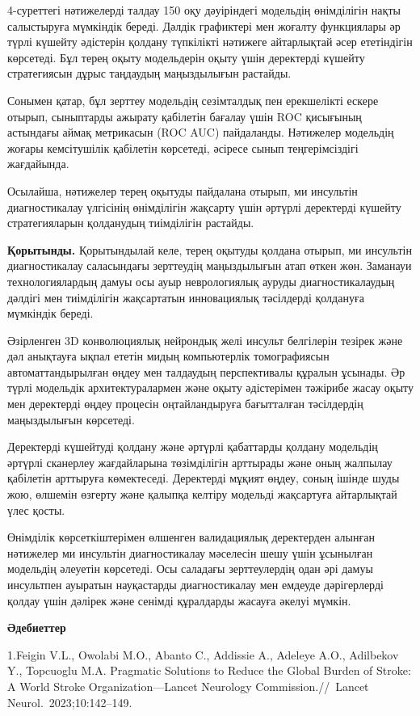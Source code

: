 4-суреттегі нәтижелерді талдау 150 оқу дәуіріндегі модельдің өнімділігін
нақты салыстыруға мүмкіндік береді. Дәлдік графиктері мен жоғалту
функциялары әр түрлі күшейту әдістерін қолдану түпкілікті нәтижеге
айтарлықтай әсер ететіндігін көрсетеді. Бұл терең оқыту модельдерін
оқыту үшін деректерді күшейту стратегиясын дұрыс таңдаудың маңыздылығын
растайды.

Сонымен қатар, бұл зерттеу модельдің сезімталдық пен ерекшелікті ескере
отырып, сыныптарды ажырату қабілетін бағалау үшін ROC қисығының
астындағы аймақ метрикасын (ROC AUC) пайдаланды. Нәтижелер модельдің
жоғары кемсітушілік қабілетін көрсетеді, әсіресе сынып теңгерімсіздігі
жағдайында.

Осылайша, нәтижелер терең оқытуды пайдалана отырып, ми инсультін
диагностикалау үлгісінің өнімділігін жақсарту үшін әртүрлі деректерді
күшейту стратегияларын қолданудың тиімділігін растайды.

\textbf{Қорытынды.} Қорытындылай келе, терең оқытуды қолдана отырып, ми
инсультін диагностикалау саласындағы зерттеудің маңыздылығын атап өткен
жөн. Заманауи технологиялардың дамуы осы ауыр неврологиялық ауруды
диагностикалаудың дәлдігі мен тиімділігін жақсартатын инновациялық
тәсілдерді қолдануға мүмкіндік береді.

Әзірленген 3D конволюциялық нейрондық желі инсульт белгілерін тезірек
және дәл анықтауға ықпал ететін мидың компьютерлік томографиясын
автоматтандырылған өңдеу мен талдаудың перспективалы құралын ұсынады. Әр
түрлі модельдік архитектуралармен және оқыту әдістерімен тәжірибе жасау
оқыту мен деректерді өңдеу процесін оңтайландыруға бағытталған
тәсілдердің маңыздылығын көрсетеді.

Деректерді күшейтуді қолдану және әртүрлі қабаттарды қолдану модельдің
әртүрлі сканерлеу жағдайларына төзімділігін арттырады және оның жалпылау
қабілетін арттыруға көмектеседі. Деректерді мұқият өңдеу, соның ішінде
шуды жою, өлшемін өзгерту және қалыпқа келтіру модельді жақсартуға
айтарлықтай үлес қосты.

Өнімділік көрсеткіштерімен өлшенген валидациялық деректерден алынған
нәтижелер ми инсультін диагностикалау мәселесін шешу үшін ұсынылған
модельдің әлеуетін көрсетеді. Осы саладағы зерттеулердің одан әрі дамуы
инсультпен ауыратын науқастарды диагностикалау мен емдеуде дәрігерлерді
қолдау үшін дәлірек және сенімді құралдарды жасауға әкелуі мүмкін.

\textbf{Әдебиеттер}

1.Feigin V.L., Owolabi M.O., Abanto C., Addissie A., Adeleye A.O.,
Adilbekov Y., Topcuoglu M.A. Pragmatic Solutions to Reduce the Global
Burden of Stroke: A World Stroke Organization---Lancet Neurology
Commission.//~Lancet Neurol.~2023;10:142--149.

